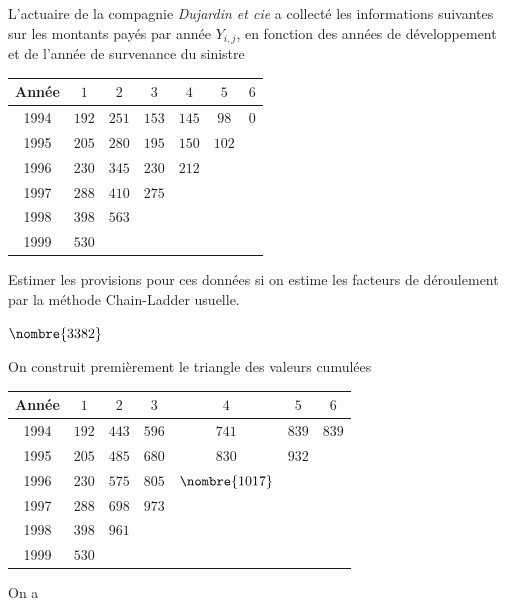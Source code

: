\begin{exercice}
  L'actuaire de la compagnie \emph{Dujardin et cie} a collecté les
  informations suivantes sur les montants payés par année $Y_{i,j}$,
  en fonction des années de développement et de l'année de survenance
  du sinistre
  \begin{center}
    \begin{tabular}{|c|c c c c c c|}\hline
      Année & $1$ & $2$ & $3$ & $4$ & $5$ & $6$ \\ \hline
      1994 & $192$ & $251$ & $153$ & $145$ & $98$  & $0$ \\
      1995 & $205$ & $280$ & $195$ & $150$ & $102$ &   \\
      1996 & $230$ & $345$ & $230$ & $212$ &     &   \\
      1997 & $288$ & $410$ & $275$ &     &     &   \\
      1998 & $398$ & $563$ &     &     &     &   \\
      1999 & $530$ &     &     &     &     &   \\ \hline
    \end{tabular}
  \end{center}
  Estimer les provisions pour ces données si on estime les facteurs de
  déroulement par la méthode Chain-Ladder usuelle.
  \begin{rep}
    $\nombre{3382}$
  \end{rep}
  \begin{sol}
    On construit premièrement le triangle des valeurs cumulées
    \begin{center}
      \begin{tabular}{|c|c c c c c c|}\hline
        Année & $1$ & $2$ & $3$ & $4$ & $5$ & $6$ \\ \hline
        1994 & $192$ & $443$ & $596$ & $741$ & $839$  & $839$ \\
        1995 & $205$ & $485$ & $680$ & $830$ & $932$ &   \\
        1996 & $230$ & $575$ & $805$ & $\nombre{1017}$ &     &   \\
        1997 & $288$ & $698$ & $973$ &     &     &   \\
        1998 & $398$ & $961$ &     &     &     &   \\
        1999 & $530$ &     &     &     &     &   \\ \hline
      \end{tabular}
    \end{center}
    On a
    \begin{align*}

\end{align*}
\end{sol}
\end{exercice}
